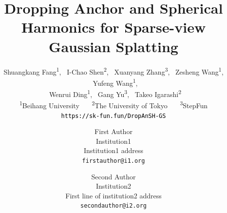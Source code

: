 \documentclass[10pt,twocolumn,letterpaper]{article}
\title{Dropping Anchor and Spherical Harmonics for Sparse-view \\Gaussian Splatting}
\author{Shuangkang Fang\textsuperscript{1}, 
~I-Chao Shen\textsuperscript{2}, 
~Xuanyang Zhang\textsuperscript{3},
~Zesheng Wang\textsuperscript{1},
~Yufeng Wang\textsuperscript{1},\\
~Wenrui Ding\textsuperscript{1}, 
~Gang Yu\textsuperscript{3},
~Takeo Igarashi\textsuperscript{2}\\
\textsuperscript{1}Beihang University~~~ \textsuperscript{2}The University of Tokyo~~~
\textsuperscript{3}StepFun\\
{\textcolor{black}{\tt\small https://sk-fun.fun/DropAnSH-GS}}
}
\author{First Author\\
Institution1\\
Institution1 address\\
{\tt\small firstauthor@i1.org}
\and
Second Author\\
Institution2\\
First line of institution2 address\\
{\tt\small secondauthor@i2.org}
}
\begin{document}
\maketitle
    






{
    \small
    
    
}


\end{document}

